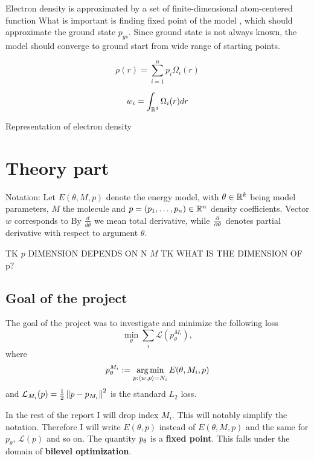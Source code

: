 \documentclass[a4paper,10pt]{report}
\begin{document}
Electron density is approximated by a set of finite-dimensional  atom-centered function
What is important is finding fixed point of the model , which should approximate the ground state $p_{gs}$.
Since ground state is not always known, the model should converge to ground start from wide range of starting points.

\begin{equation}
 \rho(r) = \sum_{i=1}^n p_i \Omega_i(r)
\end{equation}

\begin{equation}
 w_i = \int_{\mathbb{R}^3} \Omega_i(r)dr
\end{equation}

Representation of electron density
\newpage
\section{Theory part}
Notation: Let $E(\theta, M ,p)$ denote the energy model, with $\theta \in \mathbb{R}^k$ being model parameters, $M$ the molecule and $p=(p_1, \ldots ,p_n )\in \mathbb{R}^n$ density coefficients. Vector $w$ corresponds to
By $\frac{d}{d\theta}$ we mean total derivative, while $\frac{\partial }{\partial \theta}$ denotes partial derivative with respect to argument $\theta$.

TK $p$ DIMENSION DEPENDS ON N $M$
TK WHAT IS THE DIMENSION OF p?



\subsection{Goal of the project}
The goal of the project was to investigate and minimize the following loss
\begin{equation}\label{bilevel}
 \min_\theta \sum_i \mathcal{L}(p_{\theta}^{M_i}),
\end{equation}
where
\begin{equation}
  p_\theta^{M_i}:=\operatorname*{arg\,min}_{p : \langle w, p \rangle=N_i} E(\theta,M_i,p)
\end{equation}
and $\mathcal{L}_{M_i}(p) = \frac{1}{2}\left\|p-p_{M_i}\right\|^2$ is the standard $L_2$ loss.

In the rest of the report I will drop index $M_i$. This will notably simplify the notation.
Therefore I will write $E(\theta,p)$ instead of $E(\theta,M,p)$ and the same for $p_\theta$, $\mathcal{L}(p)$ and so on.
The quantity $p_\theta$ is a \textbf{fixed point}.
This falls under the domain of \textbf{bilevel optimization}.
\end{document}
